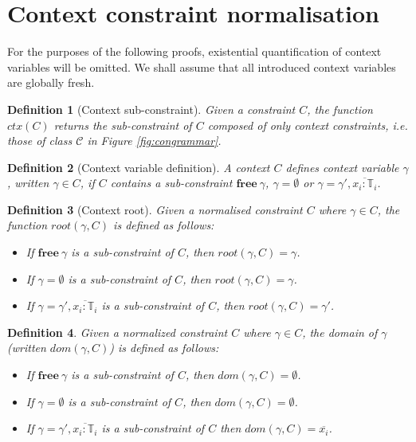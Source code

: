 \documentclass[preprint]{sigplanconf}
\newtheorem{defn}{Definition}
\newcommand{\figref}[1]{Figure \ref{#1}}
\newcommand{\free}[1]{\mathbf{free}\:#1}
\newcommand{\tinf}{\mathbb{T}}
\begin{document}

\section{Context constraint normalisation}

For the purposes of the following proofs, existential quantification of
context variables will be omitted. We shall assume that all introduced
context variables are globally fresh.

\begin{defn}[Context sub-constraint]
Given a constraint $C$, the function $ctx(C)$ returns the sub-constraint
of $C$ composed of only context constraints, i.e. those of class $\mathcal{C}$
in \figref{fig:congrammar}.
\end{defn}

\begin{defn}[Context variable definition]
A context $C$ {\it defines} context variable $\gamma$, written
$\gamma \in C$, if $C$ contains a sub-constraint $\free{\gamma}$,
$\gamma = \emptyset$ or $\gamma = \gamma', \overline{x_i : \tinf_i}$.
\end{defn}

\begin{defn}[Context root]
Given a normalised constraint $C$ where $\gamma \in C$, the 
function $root(\gamma, C)$ is defined as follows:

\begin{itemize}
\item If $\free{\gamma}$ is a sub-constraint of $C$, then $root(\gamma, C) = \gamma$.
\item If $\gamma = \emptyset$ is a sub-constraint of $C$, then $root(\gamma, C) = \gamma$.
\item If $\gamma = \gamma', \overline{x_i : \tinf_i}$ is a sub-constraint of $C$, then
$root(\gamma, C) = \gamma'$.
\end{itemize}
\end{defn}

\begin{defn}
Given a normalized constraint $C$ where $\gamma \in C$,
the {\it domain} of $\gamma$ (written $dom(\gamma, C)$) is defined as follows:

\begin{itemize}
\item If $\free{\gamma}$ is a sub-constraint of $C$, 
then $dom(\gamma, C) = \emptyset$.
\item If $\gamma = \emptyset$ is a sub-constraint of $C$,
then $dom(\gamma, C) = \emptyset$.
\item If $\gamma = \gamma', \overline{x_i : \tinf_i}$ is a sub-constraint of $C$
then $dom(\gamma, C) = \overline{x_i}$.
\end{itemize}
\end{defn}
\end{document}
